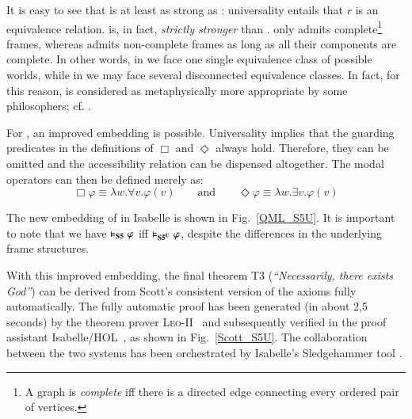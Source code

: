 \documentclass{article}
\newcommand{\Dia}{\Diamond} %
\newcommand{\BlackBox}{\blacksquare}
\newcommand{\BlackDia}{\Diamondblack}
\begin{document}
It is easy to see that \SFiveU is at least as strong as \SFive:
universality entails that $r$ is an equivalence relation. \SFiveU is,
in fact, \emph{strictly stronger} than \SFive. \SFiveU only admits
complete\footnote{A graph is \emph{complete} iff there is a directed
  edge connecting every ordered pair of vertices.} frames, whereas
\SFive admits non-complete frames as long as all their components are
complete. In other words, in \SFiveU we face one single equivalence
class of possible worlds, while in \SFive we may face several
disconnected equivalence classes. In fact, for this reason, \SFiveU is
considered as metaphysically more appropriate by some philosophers;
cf. \cite[p.~127]{williamson13}.

For \SFiveU, an improved embedding is possible. Universality implies
that the guarding predicates in the definitions of $\Box$ and
$\Diamond$ always hold. Therefore, they can be omitted and the
accessibility relation can be dispensed altogether. The modal
operators can then be defined merely as:
\[\Box \varphi \equiv \lambda w. \forall v.  \varphi(v) \qquad \text{and}
\qquad \Dia \varphi \equiv \lambda w.\exists v. \varphi(v)\]


The new embedding of \SFiveU in Isabelle is shown in
Fig.~\ref{QML_S5U}. It is important to note that we 
have  $\vDash_{\textbf{S5}} \varphi$ iff $\vDash_{\textbf{S5\textsuperscript{U}}} \varphi$,
despite the differences in the underlying frame structures.


%
%
With this improved embedding, the final theorem T3
(\textit{``Necessarily, there exists God''}) can be derived from
Scott's consistent version of the axioms fully automatically.  The fully
automatic proof has been generated (in about 2,5 seconds) by the theorem prover
\textsc{Leo-II}~\cite{C26} and subsequently verified in the proof
assistant Isabelle/HOL~\cite{NPW02}, as shown in Fig.~\ref{Scott_S5U}.
The collaboration between the two systems has been orchestrated by
Isabelle's Sledgehammer tool \cite{Sledgehammer}.
\end{document}
